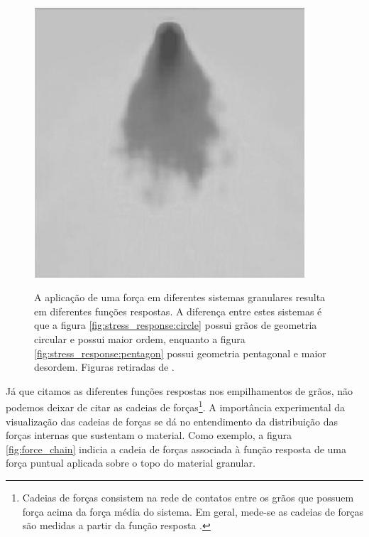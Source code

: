 \begin{figure}
\begin{minipage}{.45\linewidth}
        \includegraphics[width=0.9\textwidth]{04-figuras/Funcao_Resposta2.png}
        \label{fig:stress_response:pentagon}
    \end{minipage}
    \caption{A aplicação de uma força em diferentes sistemas granulares resulta em diferentes funções respostas. A diferença entre estes sistemas é que a figura \ref{fig:stress_response:circle} possui grãos de geometria circular e possui maior ordem, enquanto a figura \ref{fig:stress_response:pentagon} possui geometria pentagonal e maior desordem. Figuras retiradas de \cite{Sensitivity_of_Stress_Response_Function_to_Packing_Preparation}.}
    \label{fig:stress_response}
\end{figure}

    Já que citamos as diferentes funções respostas nos empilhamentos de grãos, não podemos deixar de citar as cadeias de forças\footnote{Cadeias de forças consistem na rede de contatos entre os grãos que possuem força acima da força média do sistema. Em geral, mede-se as cadeias de forças são medidas a partir da função resposta \cite{The_Physics_of_Granular_Media}.}. A importância experimental da visualização das cadeias de forças se dá no entendimento da distribuição das forças internas que sustentam o material. Como exemplo, a figura \ref{fig:force_chain} indicia a cadeia de forças associada à função resposta de uma força puntual aplicada sobre o topo do material granular.

